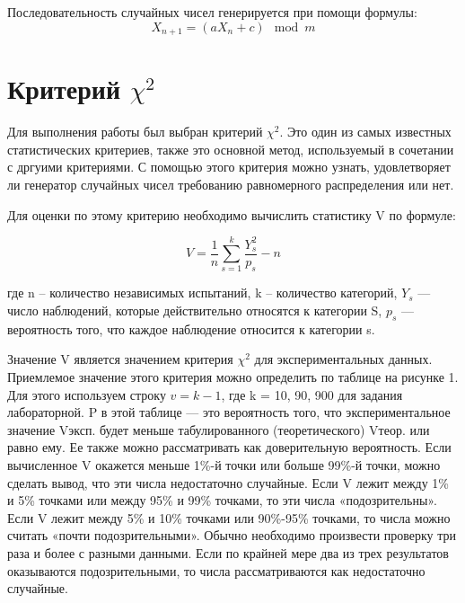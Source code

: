 \documentclass[12pt,a4paper,oneside]{report}
\begin{document}
Последовательность случайных чисел генерируется при помощи формулы:
\begin{equation}
X_{n+1}=(aX_n+c)\mod m
\end{equation}

\section*{Критерий $\chi^2$}
\quad Для выполнения работы был выбран критерий $\chi^2$. Это один из самых известных статистических критериев,  также это основной метод, используемый в сочетании с дргуими критериями. С помощью этого критерия можно узнать, удовлетворяет ли генератор случайных чисел требованию равномерного распределения или нет.

Для оценки по этому критерию необходимо вычислить статистику V по формуле:

\begin{equation}
    V = \frac{1}{n} \sum_{s=1}^{k}  \frac{Y_{s}^{2}}{p_{s}} - n
\end{equation}

где n – количество независимых испытаний, k – количество категорий, $Y_{s}$ — число наблюдений, которые действительно относятся к категории S,  $p_{s}$ — вероятность того, что каждое наблюдение относится к категории s.  

Значение V является значением критерия $\chi^2$ для экспериментальных данных. Приемлемое значение этого критерия можно определить по таблице на рисунке 1. Для этого используем строку $v = k - 1$, где k = 10, 90, 900 для задания лабораторной. P в этой таблице — это вероятность того, что экспериментальное значение Vэксп. будет меньше табулированного (теоретического) Vтеор. или равно ему. Ее также можно рассматривать как доверительную вероятность. Если вычисленное V окажется меньше 1\%-й точки или больше 99\%-й точки, можно сделать вывод, что эти числа недостаточно случайные. Если V лежит между 1\% и 5\% точками или между 95\% и 99\% точками, то эти числа «подозрительны». Если V лежит между 5\% и 10\% точками или 90\%-95\% точками, то числа можно считать «почти подозрительными». Обычно необходимо произвести проверку три раза и более с разными данными. Если по крайней мере два из трех результатов оказываются подозрительными, то числа рассматриваются как недостаточно случайные.  
\end{document}
